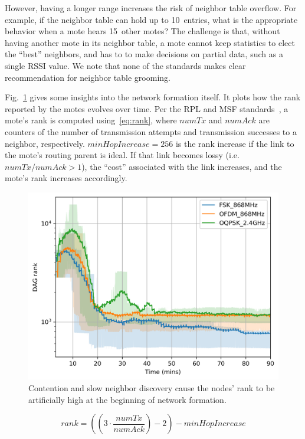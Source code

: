 \documentclass[sensors,article,submit,moreauthors,pdftex]{Definitions/mdpi}
\begin{document}

However, having a longer range increases the risk of neighbor table overflow.
For example, if the neighbor table can hold up to 10~entries, what is the appropriate behavior when a mote  hears 15~other motes?
The challenge is that, without having another mote in its neighbor table, a mote cannot keep statistics to elect the ``best'' neighbors, and has to to make decisions on partial data, such as a single RSSI value.
We note that none of the standards makes clear recommendation for neighbor table grooming.


Fig.~\ref{fig:dagrank_time} gives some insights into the network formation itself.
It plots how the rank reported by the motes evolves over time.
Per the RPL and MSF standards~\cite{rfc6550,draft-ietf-6tisch-msf}, a mote's rank is computed using~\eqref{eq:rank}, where $numTx$ and $numAck$ are counters of the number of transmission attempts and transmission successes to a neighbor, respectively.
$minHopIncrease = 256$ is the rank increase if the link to the mote's routing parent is ideal.
If that link becomes lossy (i.e.~$numTx/numAck>1$), the ``cost'' associated with the link increases, and the mote's rank increases accordingly.

\begin{figure}
	\centering
	\includegraphics[width=0.85\columnwidth]{dagrank_time}
    \caption{Contention and slow neighbor discovery cause the nodes' rank to be artificially high at the beginning of network formation.}
    \label{fig:dagrank_time}
\end{figure}

\begin{equation}
    rank = ((3 \cdot \frac{numTx}{numAck})-2)-minHopIncrease
    \label{eq:rank}
\end{equation}
\end{document}
